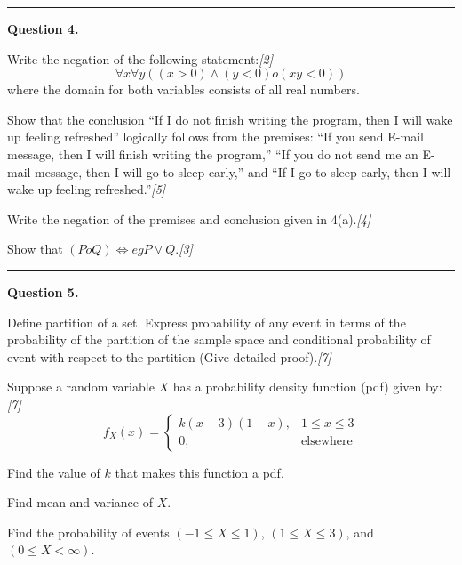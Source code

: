 \documentclass[11pt,a4paper]{article}
\newcommand{\pts}[1]{\hfill   \textit{[#1]}}
\begin{document}
\medskip\rule{\linewidth}{0.2pt}\medskip




\noindent   \textbf{Question 4.}

\begin{parts}
  \item Write the negation of the following statement:\pts{2}
  \[
    \forall x \forall y ((x > 0) \land (y < 0)  o (xy < 0))
  \]
  where the domain for both variables consists of all real numbers.
  \item Show that the conclusion ``If I do not finish writing the program, then I will wake up feeling refreshed'' logically follows from the premises: ``If you send E-mail message, then I will finish writing the program,'' ``If you do not send me an E-mail message, then I will go to sleep early,'' and ``If I go to sleep early, then I will wake up feeling refreshed.''\pts{5}
  \item Write the negation of the premises and conclusion given in 4(a).\pts{4}
  \item Show that $(P  o Q) \iff 
eg P \lor Q$.\pts{3}
\end{parts}

\medskip\rule{\linewidth}{0.2pt}\medskip




\noindent   \textbf{Question 5.}

\begin{parts}
  \item Define partition of a set. Express probability of any event in terms of the probability of the partition of the sample space and conditional probability of event with respect to the partition (Give detailed proof).\pts{7}
  \item Suppose a random variable $X$ has a probability density function (pdf) given by:\pts{7}
  \[
    f_X(x) = 
\begin{cases} k(x-3)(1-x), & 1 \le x \le 3 \\ 0, &  \text{elsewhere} \end{cases}
  \]
  
\begin{parts}
    \item Find the value of $k$ that makes this function a pdf.
    \item Find mean and variance of $X$.
    \item Find the probability of events $(-1 \le X \le 1)$, $(1 \le X \le 3)$, and $(0 \le X < \infty)$.
  \end{parts}
\end{parts}
\end{document}
